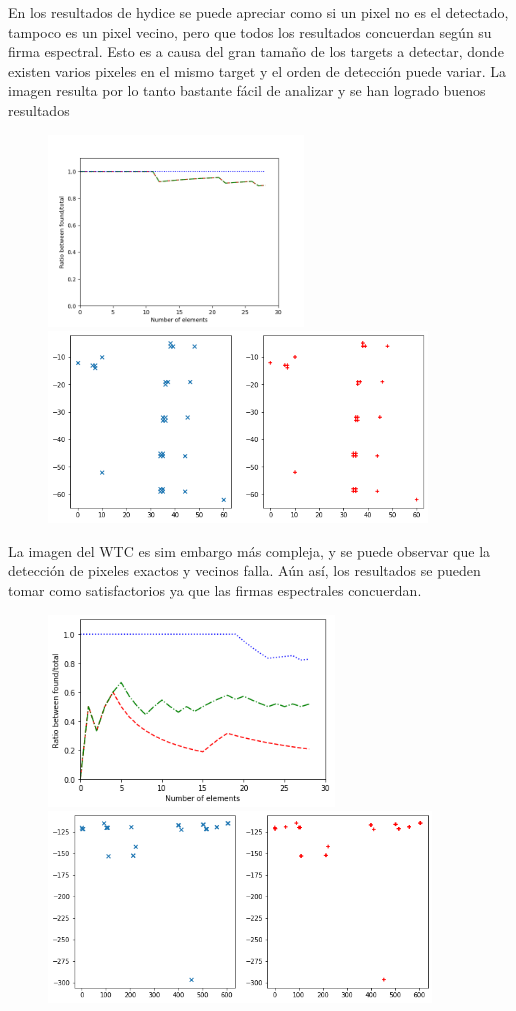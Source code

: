 En los resultados de hydice se puede apreciar como si un pixel no es el detectado, tampoco es un pixel vecino, pero que todos los resultados concuerdan según su firma espectral. Esto es a causa del gran tamaño de los targets a detectar, donde existen varios pixeles en el mismo target y el orden de detección puede variar. La imagen resulta por lo tanto bastante fácil de analizar y se han logrado buenos resultados
\begin{figure}[!ht]
	\includegraphics[height=2.0in]{figures/hydice.png}
	\includegraphics[height=2.0in]{figures/hydice_res.png}
\end{figure}

La imagen del WTC es sim embargo más compleja, y se puede observar que la detección de pixeles exactos y vecinos falla. Aún así, los resultados se pueden tomar como satisfactorios ya que las firmas espectrales concuerdan.
\begin{figure}[!ht]
	\includegraphics[height=2.0in]{figures/wtc.png}
	\includegraphics[height=2.0in]{figures/wtc_res.png}
\end{figure}


